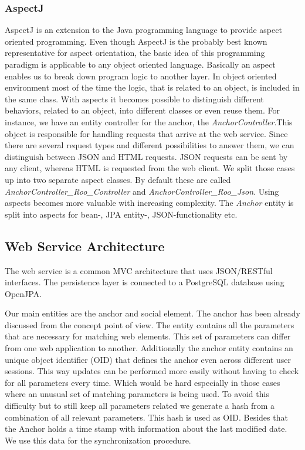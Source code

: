 \subsubsection*{AspectJ}
	AspectJ is an extension to the Java programming language to provide aspect oriented programming. Even though AspectJ is the probably best known representative for aspect orientation, the basic idea of this programming paradigm is applicable to any object oriented language.
	Basically an aspect enables us to break down program logic to another layer. In object oriented environment most of the time the logic, that is related to an object, is included in the same class. With aspects it becomes possible to distinguish different behaviors, related to an object, into different classes or even reuse them. 
	For instance, we have an entity controller for the anchor, the \textit{AnchorController}.This object is responsible for handling requests that arrive at the web service. Since there are several request types and different possibilities to answer them, we can distinguish between JSON and HTML requests. JSON requests can be sent by any client, whereas HTML is requested from the web client. We split those cases up into two separate aspect classes. By default these are called \textit{AnchorController\_Roo\_Controller} and \textit{AnchorController\_Roo\_Json}. 
	Using aspects becomes more valuable with increasing complexity. The \textit{Anchor} entity is split into aspects for bean-, JPA entity-, JSON-functionality etc.

\newpage
\subsection{Web Service Architecture}\label{ws-architecture-intro}
The web service is a common MVC architecture that uses JSON/RESTful interfaces. The persistence layer is connected to a PostgreSQL database using OpenJPA. 

Our main entities are the anchor and social element. The anchor has been already discussed from the concept point of view. The entity contains all the parameters that are necessary for matching web elements. This set of parameters can differ from one web application to another. Additionally the anchor entity contains an unique object identifier (OID) that defines the anchor even across different user sessions. This way updates can be performed more easily without having to check for all parameters every time. Which would be hard especially in those cases where an unusual set of matching parameters is being used. To avoid this difficulty but to still keep all parameters related we generate a hash from a combination of all relevant parameters. This hash is used as OID. 
Besides that the Anchor holds a time stamp with information about the last modified date. We use this data for the synchronization procedure. 

